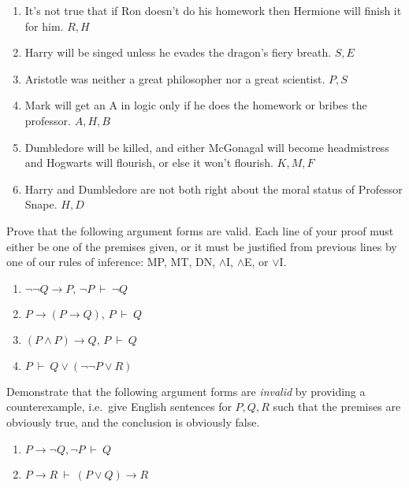 \begin{exercises}
\begin{enumerate}
\item It's not true that if Ron doesn't do his homework then Hermione
  will finish it for him.  $R,H$
\item Harry will be singed unless he evades the dragon's fiery breath.
  $S,E$
\item Aristotle was neither a great philosopher nor a great scientist.
  $P,S$
\item Mark will get an A in logic only if he does the homework or
  bribes the professor. $A,H,B$
\item Dumbledore will be killed, and either McGonagal will become
  headmistress and Hogwarts will flourish, or else it won't
  flourish. $K,M,F$
\item Harry and Dumbledore are not both right about the moral status
  of Professor Snape.  $H,D$

\end{enumerate}
\end{exercises}

\begin{exercises} Prove that the following argument forms are valid.
  Each line of your proof must either be one of the premises given, or
  it must be justified from previous lines by one of our rules of
  inference: MP, MT, DN, $\wedge$I, $\wedge$E, or $\vee$I.
\begin{enumerate}
\item $\neg \neg Q\to P,\,\neg P\:\vdash\:\neg Q$
\item $P\to (P\to Q),\,P\:\vdash\: Q$
\item $(P\wedge P)\to Q,\, P\:\vdash\: Q$
\item $P\:\vdash\: Q\vee (\neg\neg P\vee R)$
\end{enumerate} \end{exercises}

\begin{exercise} Demonstrate that the following argument forms are \emph{invalid}
  by providing a counterexample, i.e.\ give English sentences for
  $P,Q,R$ such that the premises are obviously true, and the conclusion
  is obviously false. 
  \begin{enumerate}
  \item $P\to \neg Q,\neg P \: \vdash \: Q$
  \item $P\to R\:\vdash \: (P\vee Q)\to R$
  \end{enumerate}
  \end{exercise}

   
